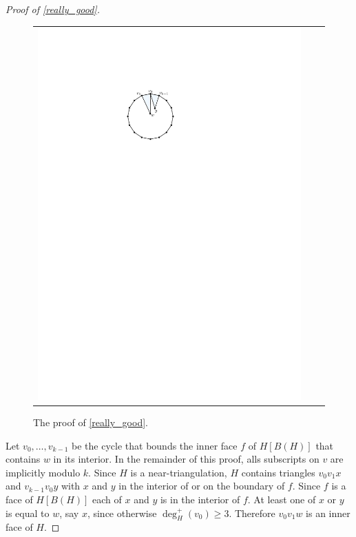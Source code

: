 \documentclass[a4paper,UKenglish,cleveref, autoref, thm-restate]{lipics-v2021}
\newcommand{\pat}[1]{[\textcolor{red}{PM: #1}]}
\newcommand{\hussein}[1]{[\textcolor{purple}{$H^2$: #1}]}
\begin{document}
\begin{proof}[Proof of \cref{really_good}]
\begin{figure}
\begin{tabular}{ccc}
      \includegraphics[page=3]{figs/really_good}
    \end{tabular}
    \caption{The proof of \cref{really_good}.
    }
    \label{really_good_fig}
  \end{figure}

  Let $v_0,\ldots,v_{k-1}$ be the cycle that bounds the inner face $f$ of $H[B(H)]$ that contains $w$ in its interior. In the remainder of this proof, alls subscripts on $v$ are implicitly modulo $k$.  Since $H$ is a near-triangulation, $H$ contains triangles $v_0v_1x$ and $v_{k-1}v_0 y$ with $x$ and $y$ in the interior of or on the boundary of $f$.  Since $f$ is a face of $H[B(H)]$ each of $x$ and $y$ is in the interior of $f$.  At least one of $x$ or $y$ is equal to $w$, say $x$, since otherwise $\deg^+_H(v_0)\ge 3$.  Therefore $v_0v_1 w$ is an inner face of $H$.


\end{proof}
\end{document}
